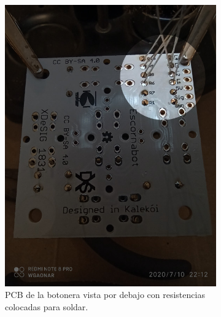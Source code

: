 \documentclass{article}
\begin{document}
\begin{figure}[htbp]
    \centering
    \begin{subfigure}[t]{0.3\textwidth}
        \centering
        \includegraphics[width=0.9\columnwidth, height=1.2\columnwidth]{images/Botonera/botonera1.jpg}
        \caption{PCB de la botonera vista por debajo con resistencias colocadas para soldar.}
        \label{fig:botonera_resistencias1}
    \end{subfigure}%
    \begin{subfigure}[t]{0.3\textwidth}
        \centering

\end{subfigure}
\end{figure}
\end{document}
